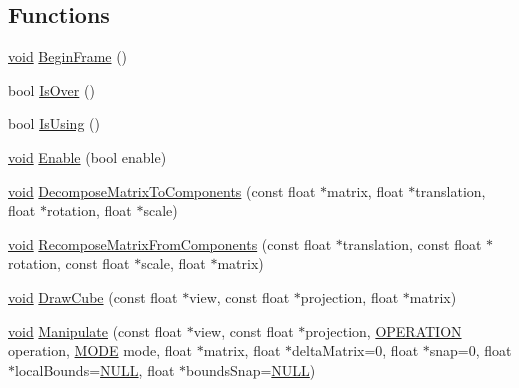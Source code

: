 \subsection*{Functions}
\begin{DoxyCompactItemize}
\item 
\mbox{\hyperlink{_thread_8h_af1e856da2e658414cb2456cb6f7ebc66}{void}} \mbox{\hyperlink{namespace_im_guizmo_a2dfada1eb84fda54a892be444caf0588}{Begin\+Frame}} ()
\item 
bool \mbox{\hyperlink{namespace_im_guizmo_a258cf4380b3da155f7eb721542b50f67}{Is\+Over}} ()
\item 
bool \mbox{\hyperlink{namespace_im_guizmo_ac9bdd0b810d82ed4fa06e0dd2d1f3cc1}{Is\+Using}} ()
\item 
\mbox{\hyperlink{_thread_8h_af1e856da2e658414cb2456cb6f7ebc66}{void}} \mbox{\hyperlink{namespace_im_guizmo_a849497d6fd8adb2569adfa18c2841d77}{Enable}} (bool enable)
\item 
\mbox{\hyperlink{_thread_8h_af1e856da2e658414cb2456cb6f7ebc66}{void}} \mbox{\hyperlink{namespace_im_guizmo_a8cc3ef9e0b149b8276fe69817360ee25}{Decompose\+Matrix\+To\+Components}} (const float $\ast$matrix, float $\ast$translation, float $\ast$rotation, float $\ast$scale)
\item 
\mbox{\hyperlink{_thread_8h_af1e856da2e658414cb2456cb6f7ebc66}{void}} \mbox{\hyperlink{namespace_im_guizmo_a70bc9423194e2ab58e351ea881126b17}{Recompose\+Matrix\+From\+Components}} (const float $\ast$translation, const float $\ast$rotation, const float $\ast$scale, float $\ast$matrix)
\item 
\mbox{\hyperlink{_thread_8h_af1e856da2e658414cb2456cb6f7ebc66}{void}} \mbox{\hyperlink{namespace_im_guizmo_acc60c99158253466671e9aac426f52f2}{Draw\+Cube}} (const float $\ast$view, const float $\ast$projection, float $\ast$matrix)
\item 
\mbox{\hyperlink{_thread_8h_af1e856da2e658414cb2456cb6f7ebc66}{void}} \mbox{\hyperlink{namespace_im_guizmo_a6b1cb04f6a6cacb5029c1163848a510e}{Manipulate}} (const float $\ast$view, const float $\ast$projection, \mbox{\hyperlink{namespace_im_guizmo_a3559e88fd6409ce121ee4d9847867cd1}{O\+P\+E\+R\+A\+T\+I\+ON}} operation, \mbox{\hyperlink{namespace_im_guizmo_a555eafa3970d08a1afb7b47bce89d05a}{M\+O\+DE}} mode, float $\ast$matrix, float $\ast$delta\+Matrix=0, float $\ast$snap=0, float $\ast$local\+Bounds=\mbox{\hyperlink{_util_8h_a070d2ce7b6bb7e5c05602aa8c308d0c4}{N\+U\+LL}}, float $\ast$bounds\+Snap=\mbox{\hyperlink{_util_8h_a070d2ce7b6bb7e5c05602aa8c308d0c4}{N\+U\+LL}})
\end{DoxyCompactItemize}


